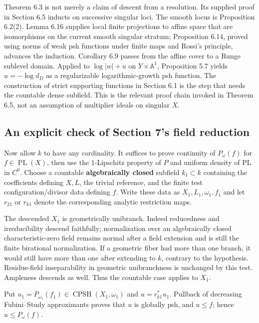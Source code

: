 \documentclass[11pt]{article}
\begin{document}
Theorem 6.3 is not merely a claim of descent from a resolution. Its
supplied proof in Section 6.5 inducts on successive singular loci. The
smooth locus is Proposition 6.2(2). Lemma 6.16 supplies local finite
projections to affine space that are isomorphisms on the current smooth
singular stratum; Proposition 6.14, proved using norms of weak psh
functions under finite maps and Rossi's principle, advances the
induction. Corollary 6.9 passes from the affine cover to a Runge
sublevel domain. Applied to \(\log|w|+u\) on \(Y\times\mathbb A^1\),
Proposition 5.7 yields \(u=-\log d_D\) as a regularizable
logarithmic-growth psh function. The construction of strict supporting
functions in Section 6.1 is the step that needs the countable dense
subfield. This is the relevant proof chain invoked in Theorem 6.5, not
an assumption of multiplier ideals on singular \(X\).

\subsection{An explicit check of Section 7's field
reduction}\label{an-explicit-check-of-section-7s-field-reduction}

Now allow \(k\) to have any cardinality. It suffices to prove continuity
of \(P_\omega(f)\) for \(f\in\operatorname{PL}(X)\), then use the
\(1\)-Lipschitz property of \(P\) and uniform density of PL in \(C^0\).
Choose a countable \textbf{algebraically closed} subfield
\(k_1\subset k\) containing the coefficients defining \(X,L\), the
trivial reference, and the finite test configuration/divisor data
defining \(f\). Write these data as \(X_1,L_1,\omega_1,f_1\) and let
\(r_{21}\) or \(r_{k1}\) denote the corresponding analytic restriction
maps.

The descended \(X_1\) is geometrically unibranch. Indeed reducedness and
irreducibility descend faithfully; normalization over an algebraically
closed characteristic-zero field remains normal after a field extension
and is still the finite birational normalization. If a geometric fiber
had more than one branch, it would still have more than one after
extending to \(k\), contrary to the hypothesis. Residue-field
inseparability in geometric unibranchness is unchanged by this test.
Ampleness descends as well. Thus the countable case applies to \(X_1\).

Put \(u_1=P_{\omega_1}(f_1)\in\operatorname{CPSH}(X_1,\omega_1)\) and
\(u=r_{k1}^*u_1\). Pullback of decreasing Fubini--Study approximants
proves that \(u\) is globally psh, and \(u\leq f\); hence
\(u\leq P_\omega(f)\).
\end{document}
